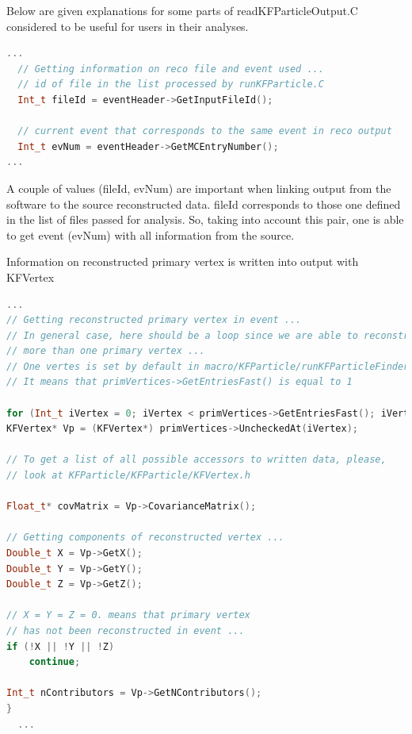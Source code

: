 \documentclass[8pt,a5paper, oldfontcommands]{memoir}
\begin{document}
Below are given explanations for some parts of {\color{blue} readKFParticleOutput.C} considered to be useful for users in their analyses.

{ \footnotesize
\begin{lstlisting}[language=C++,basicstyle=\ttfamily,keywordstyle=\color{red}, commentstyle=\color{blue}]
...
  // Getting information on reco file and event used ...
  // id of file in the list processed by runKFParticle.C
  Int_t fileId = eventHeader->GetInputFileId();

  // current event that corresponds to the same event in reco output
  Int_t evNum = eventHeader->GetMCEntryNumber(); 
...
\end{lstlisting}
}
A couple of values {\color{blue} (fileId, evNum)} are important when linking output from the software to the source reconstructed data. {\color{blue} fileId} corresponds to those one
defined in the list of files passed for analysis. So, taking into account this pair, one is able to get event {\color{blue} (evNum)} with all information from the source.

Information on reconstructed primary vertex is written into output with {\color{red} KFVertex}
{ \tiny
\begin{lstlisting}[language=C++,basicstyle=\ttfamily,keywordstyle=\color{red}, commentstyle=\color{blue}]
  ...
// Getting reconstructed primary vertex in event ...
// In general case, here should be a loop since we are able to reconstruct 
// more than one primary vertex ...
// One vertes is set by default in macro/KFParticle/runKFParticleFinder.C 
// It means that primVertices->GetEntriesFast() is equal to 1

for (Int_t iVertex = 0; iVertex < primVertices->GetEntriesFast(); iVertex++) {
KFVertex* Vp = (KFVertex*) primVertices->UncheckedAt(iVertex);

// To get a list of all possible accessors to written data, please,
// look at KFParticle/KFParticle/KFVertex.h
            
Float_t* covMatrix = Vp->CovarianceMatrix();
            
// Getting components of reconstructed vertex ...
Double_t X = Vp->GetX();
Double_t Y = Vp->GetY();
Double_t Z = Vp->GetZ();
            
// X = Y = Z = 0. means that primary vertex
// has not been reconstructed in event ...
if (!X || !Y || !Z)
    continue;
            
Int_t nContributors = Vp->GetNContributors();
}
  ...
\end{lstlisting}
}
\end{document}
